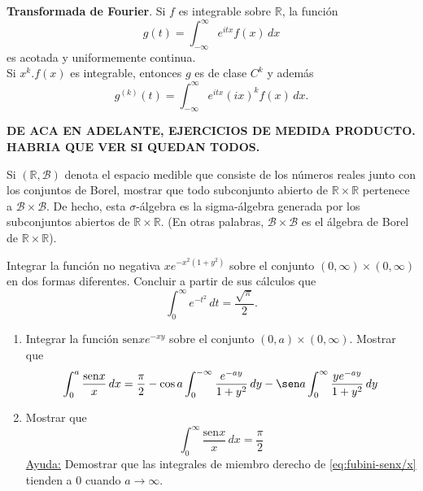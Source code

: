 \documentclass{book}
\newcommand{\rr}{\mathbb{R}}
\begin{document}
\begin{ejer}{}
  {\bf{Transformada de Fourier}}. Si $f$ es integrable sobre $\rr$, la función 
   $$g(t)=\int_{-\infty}^{\infty} e^{i t x} f(x)\,dx $$
   es acotada y uniformemente continua.
   \\
   Si $x^k.f(x)$ es integrable, entonces $g$ es de clase $C^k$ y además 
   $$g^{(k)}(t)=\int_{-\infty}^{\infty} e^{i t x} (i x)^k  f(x)\,dx.$$
 \end{ejer}
   
   
 \textbf{ DE ACA EN ADELANTE, EJERCICIOS DE MEDIDA PRODUCTO.
  HABRIA QUE VER SI QUEDAN TODOS.} 
  
\begin{ejer}{}
 Si $(\rr,\mathscr{B})$ denota el espacio medible que consiste de los números reales junto con los conjuntos 
de Borel, mostrar que todo subconjunto abierto de $\rr\times \rr$ pertenece a $\mathscr{B}\times \mathscr{B}$.
De hecho, esta $\sigma$-álgebra es la sigma-álgebra generada por los subconjuntos abiertos de $\rr\times \rr$.
(En otras palabras, $\mathscr{B}\times \mathscr{B}$ es el álgebra de Borel de $\rr \times \rr$).
\end{ejer}


\begin{ejer}{} 
Integrar la función no negativa $xe^{-x^2(1+y^2)}$ sobre el conjunto $(0,\infty)\times (0,\infty)$
en dos formas diferentes. Concluir a partir de sus cálculos que 
\[
\int_0^{\infty} e^{-t^2}\,dt=\frac{\sqrt{\pi}}{2}.
\]
\end{ejer}


\begin{ejer}{} 
\begin{enumerate}
\item Integrar la función $\text{sen} x e^{-xy}$ sobre el conjunto $(0,a)\times (0,\infty)$.
Mostrar que 
\begin{equation}\label{eq:fubini-senx/x}
\int_0^a \frac{\text{sen} x}{x}\,dx=
\frac{\pi}{2}-\cos a\int_0^{-\infty} \frac{e^{-ay}}{1+y^2}\,dy
-\sen a \int_0^{\infty} \frac{y e^{-ay}}{1+y^2}\,dy
\end{equation}
\item Mostrar que 
\[
\int_0^{\infty }\frac{\text{sen} x}{x}\,dx=\frac{\pi}{2}
\]
\underline{Ayuda:} 
Demostrar que las integrales de miembro derecho de \eqref{eq:fubini-senx/x} tienden a 0 cuando $a \to \infty$.
\end{enumerate} 
\end{ejer}
\end{document}
